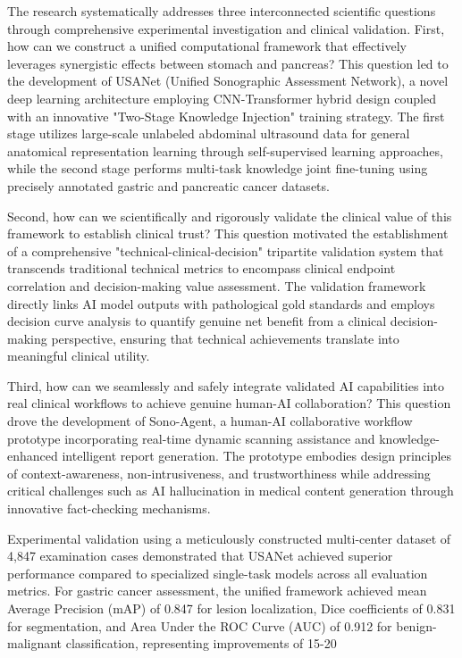 The research systematically addresses three interconnected scientific questions through comprehensive experimental investigation and clinical validation. First, how can we construct a unified computational framework that effectively leverages synergistic effects between stomach and pancreas? This question led to the development of USANet (Unified Sonographic Assessment Network), a novel deep learning architecture employing CNN-Transformer hybrid design coupled with an innovative "Two-Stage Knowledge Injection" training strategy. The first stage utilizes large-scale unlabeled abdominal ultrasound data for general anatomical representation learning through self-supervised learning approaches, while the second stage performs multi-task knowledge joint fine-tuning using precisely annotated gastric and pancreatic cancer datasets.

Second, how can we scientifically and rigorously validate the clinical value of this framework to establish clinical trust? This question motivated the establishment of a comprehensive "technical-clinical-decision" tripartite validation system that transcends traditional technical metrics to encompass clinical endpoint correlation and decision-making value assessment. The validation framework directly links AI model outputs with pathological gold standards and employs decision curve analysis to quantify genuine net benefit from a clinical decision-making perspective, ensuring that technical achievements translate into meaningful clinical utility.

Third, how can we seamlessly and safely integrate validated AI capabilities into real clinical workflows to achieve genuine human-AI collaboration? This question drove the development of Sono-Agent, a human-AI collaborative workflow prototype incorporating real-time dynamic scanning assistance and knowledge-enhanced intelligent report generation. The prototype embodies design principles of context-awareness, non-intrusiveness, and trustworthiness while addressing critical challenges such as AI hallucination in medical content generation through innovative fact-checking mechanisms.

Experimental validation using a meticulously constructed multi-center dataset of 4,847 examination cases demonstrated that USANet achieved superior performance compared to specialized single-task models across all evaluation metrics. For gastric cancer assessment, the unified framework achieved mean Average Precision (mAP) of 0.847 for lesion localization, Dice coefficients of 0.831 for segmentation, and Area Under the ROC Curve (AUC) of 0.912 for benign-malignant classification, representing improvements of 15-20%

